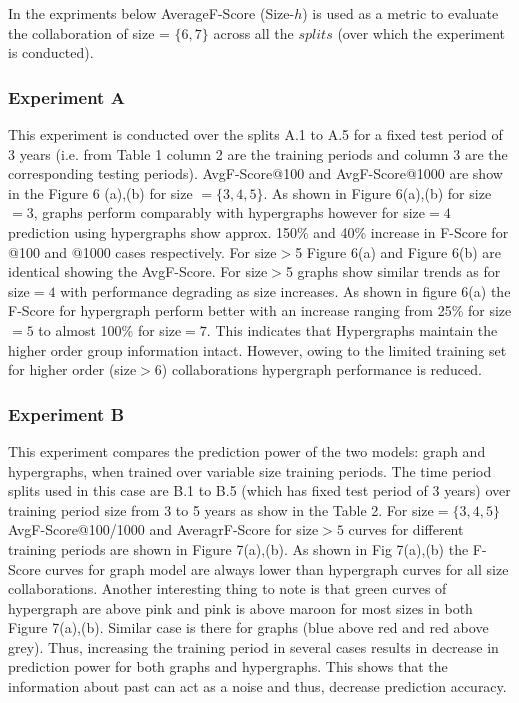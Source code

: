 \documentclass{sig-alternate}
\begin{document}
In the expriments below AverageF-Score (Size-$h$) is used as a metric to evaluate the collaboration of size = $\{6,7\}$ across all the $splits$ (over which the experiment is conducted).

\subsubsection{Experiment A}

This experiment is conducted over the splits A.1 to A.5 for a fixed test period of 3 years (i.e. from Table 1 column 2 are the training periods and column 3 are the corresponding testing periods). AvgF-Score@100 and AvgF-Score@1000 are show in the Figure 6 (a),(b) for size $= \{3,4,5\}$. As shown in Figure 6(a),(b) for size$=3$, graphs perform comparably with hypergraphs however for size$=4$ prediction using hypergraphs show approx. 150\% and 40\% increase in F-Score for @100 and @1000 cases respectively. For size$>$5 Figure 6(a) and Figure 6(b) are identical showing the AvgF-Score. For size$>$5 graphs show similar trends as for size$=4$ with performance degrading as size increases. As shown in figure 6(a) the F-Score for hypergraph perform better with an increase ranging from 25\% for size$=5$ to almost 100\% for size$=7$. This indicates that Hypergraphs maintain the higher order group information intact. However, owing to the limited training set for higher order (size$>6$) collaborations hypergraph performance is reduced. 

\subsubsection{Experiment B}

This experiment compares the prediction power of the two models: graph and hypergraphs, when trained over variable size training periods. The time period splits used in this case are B.1 to B.5 (which has fixed test period of 3 years) over training period size from 3 to 5 years as show in the Table 2. For size$=\{3,4,5\}$ AvgF-Score@100/1000 and AveragrF-Score for size$>5$ curves for different training periods are shown in Figure 7(a),(b). As shown in Fig 7(a),(b) the F-Score curves for graph model are always lower than hypergraph curves for all size collaborations. Another interesting thing to note is that green curves of hypergraph are above pink and pink is above maroon for most sizes in both Figure 7(a),(b). Similar case is there for graphs (blue above red and red above grey). Thus, increasing the training period in several cases results in decrease in prediction power for both graphs and hypergraphs. This shows that the information about past can act as a noise and thus, decrease prediction accuracy.
\end{document}
